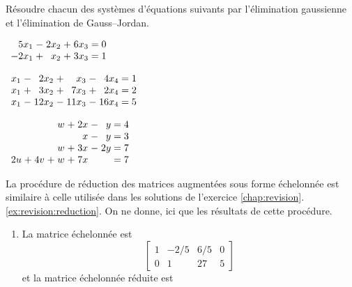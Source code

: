 \begin{exercice}
  Résoudre chacun des systèmes d'équations suivants par l'élimination
  gaussienne et l'élimination de Gauss--Jordan.
  \begin{enumerate}
    \begin{multicols}{2}
    \item $%
      \begin{array}[t]{*{2}{r@{\;}c@{\;}}r@{\;=\;}r}
        5x_1 &-& 2x_2 &+& 6x_3 & 0 \\
        -2x_1 &+&  x_2 &+& 3x_3 & 1
      \end{array}$
    \item $%
      \begin{array}[t]{*{3}{r@{\;}c@{\;}}r@{\;=\;}r}
        x_1 &-&  2x_2 &+&   x_3 &-&  4x_4 & 1 \\
        x_1 &+&  3x_2 &+&  7x_3 &+&  2x_4 & 2 \\
        x_1 &-& 12x_2 &-& 11x_3 &-& 16x_4 & 5
      \end{array}$
    \end{multicols}
    \begin{multicols}{2}
    \item $%
      \begin{array}[t]{*{4}{r@{\;}c@{\;}}r@{\;=\;}r}
        & &    & &  w &+& 2x &-&  y & 4 \\
        & &    & &    & &  x &-&  y & 3 \\
        & &    & &  w &+& 3x &-& 2y & 7 \\
        2u &+& 4v &+&  w &+& 7x & &    & 7
      \end{array}$
    \end{multicols}
  \end{enumerate}
  \begin{sol}
    La procédure de réduction des matrices augmentées sous forme
    échelonnée est similaire à celle utilisée dans les solutions de
    l'exercice \ref{chap:revision}.\ref{ex:revision:reduction}. On ne donne, ici que les
    résultats de cette procédure.
    \begin{enumerate}
    \item La matrice échelonnée est
      \begin{displaymath}
        \begin{bmatrix}
          1 & -2/5 & 6/5 & 0 \\
          0 &    1 &  27 & 5
        \end{bmatrix}
      \end{displaymath}
      et la matrice échelonnée réduite est

\end{enumerate}
\end{sol}
\end{exercice}
